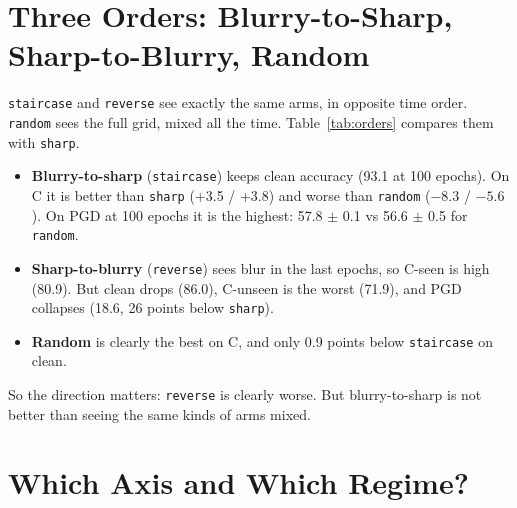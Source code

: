 \documentclass[a4paper,12pt]{report}
\newcommand{\cond}[1]{\texttt{#1}}
\begin{document}
\begin{table}[htbp]
\caption{Teacher variants at 30 epochs. Last column: share of batches on the most degraded arm in the 3rd and 5th fifth of training.}
\label{tab:teachers}
\begin{center}
\footnotesize
\setlength{\tabcolsep}{3pt}

\end{center}
\end{table}

\section{Three Orders: Blurry-to-Sharp, Sharp-to-Blurry, Random}

\cond{staircase} and \cond{reverse} see exactly the same arms, in opposite time order. \cond{random} sees the full grid, mixed all the time. Table~\ref{tab:orders} compares them with \cond{sharp}.
\begin{itemize}
\item \textbf{Blurry-to-sharp} (\cond{staircase}) keeps clean accuracy (93.1 at 100 epochs). On C it is better than \cond{sharp} (+3.5 / +3.8) and worse than \cond{random} ($-8.3$ / $-5.6$). On PGD at 100 epochs it is the highest: 57.8 $\pm$ 0.1 vs 56.6 $\pm$ 0.5 for \cond{random}.
\item \textbf{Sharp-to-blurry} (\cond{reverse}) sees blur in the last epochs, so C-seen is high (80.9). But clean drops (86.0), C-unseen is the worst (71.9), and PGD collapses (18.6, 26 points below \cond{sharp}).
\item \textbf{Random} is clearly the best on C, and only 0.9 points below \cond{staircase} on clean.
\end{itemize}
So the direction matters: \cond{reverse} is clearly worse. But blurry-to-sharp is not better than seeing the same kinds of arms mixed.

\begin{table}[htbp]
\caption{The three orders and \cond{sharp}, at 30 and 100 epochs. C-contr.: contrast corruption only. Shape: hybrid shape bias at $\sigma=2$. HP $\sigma$1: high-pass accuracy. PGD: PGD-10 at $\epsilon=1/255$.}
\label{tab:orders}
\begin{center}
\footnotesize
\setlength{\tabcolsep}{1.5pt}

\end{center}
\end{table}

\section{Which Axis and Which Regime?}
\end{document}
